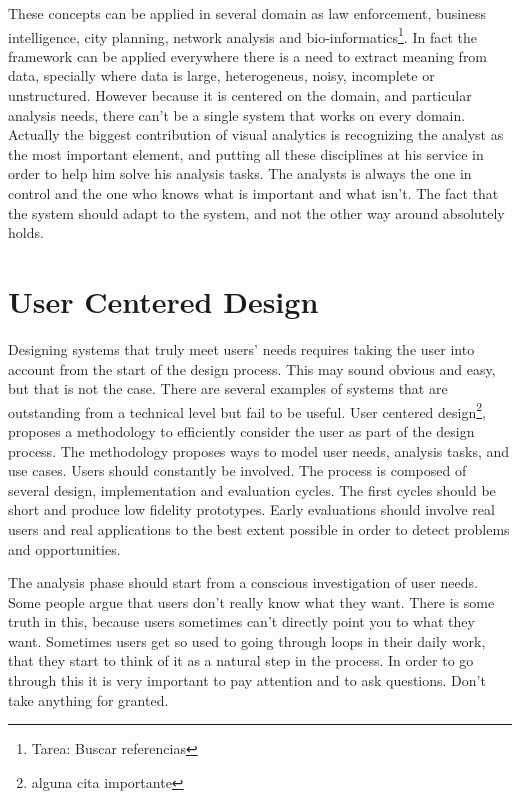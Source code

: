 These concepts can be applied in several domain as law enforcement, business intelligence, city planning, network analysis and bio-informatics\footnote{Tarea: Buscar referencias}. In fact the framework can be applied everywhere there is a need to extract meaning from data, specially where data is large, heterogeneus, noisy, incomplete or unstructured. However because it is centered on the domain, and particular analysis needs, there can't be a single system that works on every domain. Actually the biggest contribution of visual analytics is recognizing the analyst as the most important element, and putting all these disciplines at his service in order to help him solve his analysis tasks. The analysts is always the one in control and the one who knows what is important and what isn't. The fact that the system should adapt to the system, and not the other way around \autocite{norman_design_2002} absolutely holds. 

\section{User Centered Design}

Designing systems that truly meet users' needs requires taking the user into account from the start of the design process. This may sound obvious and easy, but that is not the case. There are several examples of systems that are outstanding from a technical level but fail to be useful. User centered design\footnote{alguna cita importante}, proposes a methodology to efficiently consider the user as part of the design process. The methodology proposes ways to model user needs, analysis tasks, and use cases. Users should constantly be involved. The process is composed of several design, implementation and evaluation cycles. The first cycles should be short and produce low fidelity prototypes. Early evaluations should involve real users and real applications to the best extent possible in order to detect problems and opportunities.  

The analysis phase should start from a conscious investigation of user needs. Some people argue that users don't really know what they want. There is some truth in this, because users sometimes can't directly point you to what they want. Sometimes users get so used to going through loops in their daily work, that they start to think of it as a natural step in the process. In order to go through this it is very important to pay attention and to ask questions. Don't take anything for granted. 

